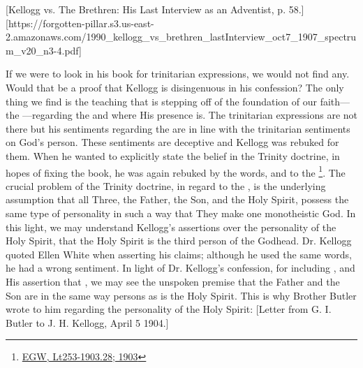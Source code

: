 [Kellogg vs. The Brethren: His Last Interview as an Adventist, p. 58.][https://forgotten-pillar.s3.us-east-2.amazonaws.com/1990\_kellogg\_vs\_brethren\_lastInterview\_oct7\_1907\_spectrum\_v20\_n3-4.pdf]


If we were to look in his book for trinitarian expressions, we would not find any. Would that be a proof that Kellogg is disingenuous in his confession? The only thing we find is the teaching that is stepping off of the foundation of our faith—the —regarding the  and where His presence is. The trinitarian expressions are not there but his sentiments regarding the  are in line with the trinitarian sentiments on God’s person. These sentiments are deceptive and Kellogg was rebuked for them. When he wanted to explicitly state the belief in the Trinity doctrine, in hopes of fixing the book, he was again rebuked by the words,  and to the \footnote{\href{https://egwwritings.org/?ref=en_Lt253-1903.28&para=9980.36}{EGW, Lt253-1903.28; 1903}}. The crucial problem of the Trinity doctrine, in regard to the , is the underlying assumption that all Three, the Father, the Son, and the Holy Spirit, possess the same type of personality in such a way that They make one monotheistic God. In this light, we may understand Kellogg's assertions over the personality of the Holy Spirit, that the Holy Spirit is the third person of the Godhead. Dr. Kellogg quoted Ellen White when asserting his claims; although he used the same words, he had a wrong sentiment. In light of Dr. Kellogg’s confession, for including , and His assertion that , we may see the unspoken premise that the Father and the Son are in the same way persons as is the Holy Spirit. This is why Brother Butler wrote to him regarding the personality of the Holy Spirit: [Letter from G. I. Butler to J. H. Kellogg, April 5 1904.]


